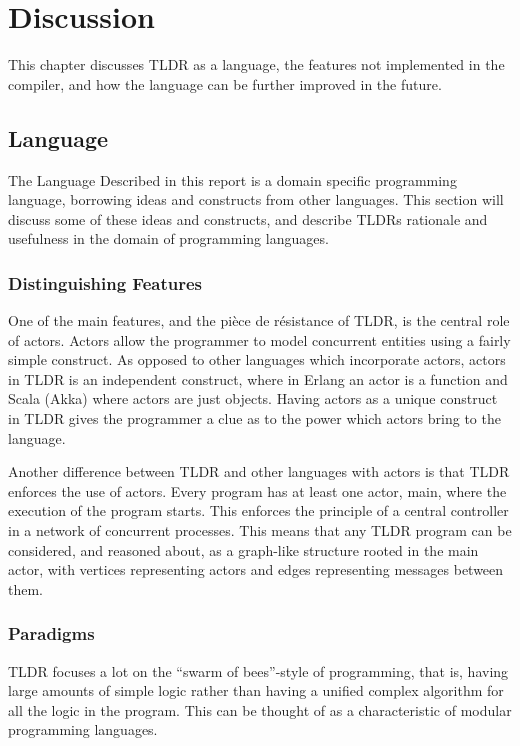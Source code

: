 \chapter{Discussion}

This chapter discusses TLDR as a language, the features not implemented in the compiler, and how the language can be further improved in the future.

\section{Language}
The Language Described in this report is a domain specific programming language, borrowing ideas and constructs from other languages. This section will discuss some of these ideas and constructs, and describe TLDRs rationale and usefulness in the domain of programming languages.

\subsection{Distinguishing Features}
One of the main features, and the pièce de résistance of TLDR, is the central role of actors. Actors allow the programmer to model concurrent entities using a fairly simple construct. As opposed to other languages which incorporate actors, actors in TLDR is an independent construct, where in Erlang an actor is a function and Scala (Akka) where actors are just objects. Having actors as a unique construct in TLDR gives the programmer a clue as to the power which actors bring to the language. 

Another difference between TLDR and other languages with actors is that TLDR enforces the use of actors. Every program has at least one actor, main, where the execution of the program starts. This enforces the principle of a central controller in a network of concurrent processes. This means that any TLDR program can be considered, and reasoned about, as a graph-like structure rooted in the main actor, with vertices representing actors and edges representing messages between them.


\subsection{Paradigms}
TLDR focuses a lot on the \enquote{swarm of bees}-style of programming, that is, having large amounts of simple logic rather than having a unified complex algorithm for all the logic in the program. This can be thought of as a characteristic of modular programming languages.

